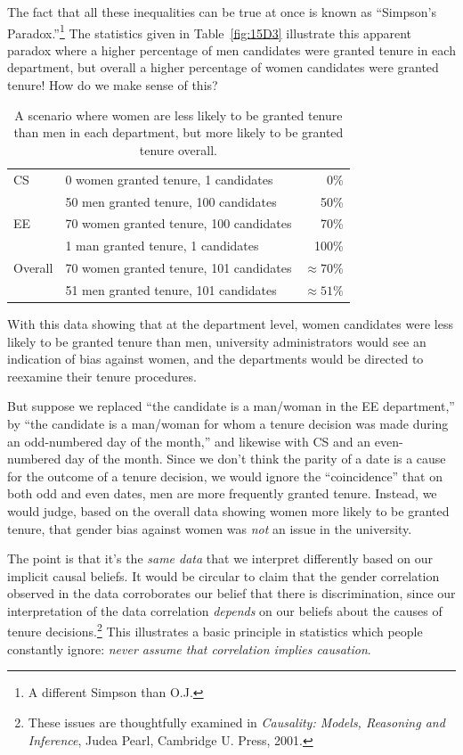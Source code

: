 \begin{editingnotes}
The fact that all these inequalities can be true at once is known as
``Simpson's Paradox.''\footnote{A different Simpson than O.J.}  The
statistics given in Table~\ref{fig:15D3} illustrate this apparent
paradox where a higher percentage of men candidates were
granted tenure in each department, but overall a higher percentage of
women candidates were granted tenure!  How do we make sense of this?

\begin{table}

\begin{tabular}{llr}
CS & 0 women granted tenure, 1 candidates      &   0\% \\
   & 50 men granted tenure, 100 candidates     &  50\% \\
EE & 70 women granted tenure, 100 candidates   &  70\% \\
   & 1 man granted tenure, 1 candidates        & 100\% \\
\hline
Overall & 70 women granted tenure, 101 candidates & $\approx 70\%$ \\
        & 51 men granted tenure, 101 candidates   & $\approx 51\%$
\end{tabular}

\caption{A scenario where women are less likely to be granted tenure
  than men in each department, but more likely to be granted tenure
  overall.}

\label{fig:15D3-tenure}

\end{table}

With this data showing that at the department level, women
candidates were less likely to be granted tenure than men, university
administrators would see an indication of bias against women,
and the departments would be directed to reexamine their tenure
procedures.

But suppose we replaced ``the candidate is a man/woman in the EE
department,'' by ``the candidate is a man/woman for whom a tenure
decision was made during an odd-numbered day of the month,'' and
likewise with CS and an even-numbered day of the month.  Since we
don't think the parity of a date is a cause for the outcome of a
tenure decision, we would ignore the ``coincidence'' that on both odd
and even dates, men are more frequently granted tenure.  Instead, we
would judge, based on the overall data showing women more likely to be
granted tenure, that gender bias against women was \emph{not} an issue
in the university.

The point is that it's the \emph{same data} that we interpret
differently based on our implicit causal beliefs.  It would be
circular to claim that the gender correlation observed in the data
corroborates our belief that there is discrimination, since our
interpretation of the data correlation \emph{depends} on our beliefs
about the causes of tenure decisions.\footnote{These issues are
  thoughtfully examined in \emph{Causality: Models, Reasoning and
    Inference}, Judea Pearl, Cambridge U. Press, 2001.}  This
illustrates a basic principle in statistics which people constantly
ignore: \emph{never assume that correlation implies causation}.

\end{editingnotes}
